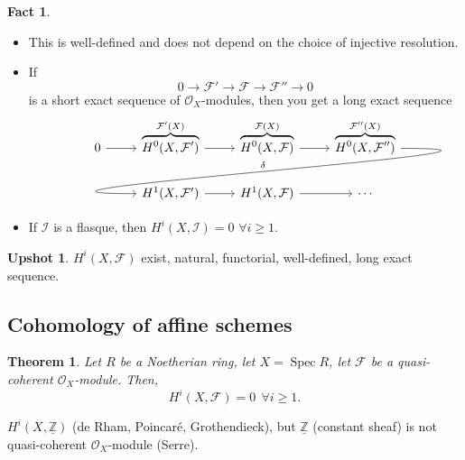 \documentclass[12pt]{article}
\DeclareMathOperator{\Spec}{Spec}
\newtheorem*{theorem}{Theorem}
\theoremstyle{definition}
\newtheorem*{fact}{Fact}
\newtheorem*{upshot}{Upshot}
\begin{document}
\begin{fact}
\begin{itemize}[label=$-$]
\item This is well-defined and does not depend on the choice of injective resolution.
\item If
\[0\longrightarrow\mathcal F'\longrightarrow\mathcal F\longrightarrow\mathcal F''\longrightarrow0\]
is a short exact sequence of $\mathcal O_X$-modules, then you get a long exact sequence
\[\begin{tikzcd}0\arrow[r]&\overbrace{H^0(X,\mathcal F')}^{\mathcal F'(X)}\arrow[r]&\overbrace{H^0(X,\mathcal F)}^{\mathcal F(X)}\arrow[r]&\overbrace{H^0(X,\mathcal F'')}^{\mathcal F''(X)}\arrow[out=0,in=180,looseness=2,overlay,lld,"\delta",swap]\\&H^1(X,\mathcal F')\arrow[r]&H^1(X,\mathcal F)\arrow[r]&\cdots\end{tikzcd}\]
\item If $\mathcal I$ is a flasque, then $H^i(X,\mathcal I)=0$ $\forall i\geq1$.
\end{itemize}
\end{fact}

\begin{upshot}
$H^i(X,\mathcal F)$ exist, natural, functorial, well-defined, long exact sequence.
\end{upshot}

\subsection*{Cohomology of affine schemes}
\begin{theorem}
Let $R$ be a Noetherian ring, let $X=\Spec R$, let $\mathcal F$ be a quasi-coherent $\mathcal O_X$-module. Then,
\[H^i(X,\mathcal F)=0\ \ \forall i\geq1.\]
\end{theorem}

$H^i(X,\underline{\mathbb Z})$ (de Rham, Poincar\'e, Grothendieck), but $\underline{\mathbb Z}$ (constant sheaf) is not quasi-coherent $\mathcal O_X$-module (Serre).
\end{document}
